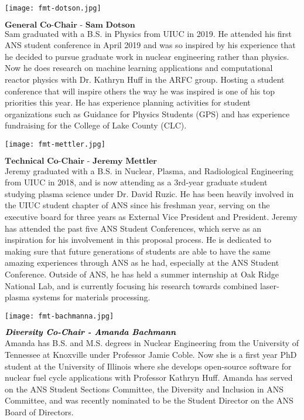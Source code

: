 \begin{minipage}{0.25\textwidth}
	\centering
	\texttt{[image: fmt-dotson.jpg]}
\end{minipage}
\begin{minipage}{0.73\textwidth}
	$\textbf{General Co-Chair - Sam Dotson}$\\
Sam graduated with a B.S. in Physics from UIUC in 2019. He attended his first ANS student conference in April 2019 and was so inspired by his experience that he decided to pursue graduate work in nuclear engineering rather than physics. Now he does research on machine learning applications and computational reactor physics with Dr. Kathryn Huff in the ARFC group. Hosting a student conference that will inspire others the way he was inspired is one of his top priorities this year. He has experience planning activities for student organizations such as Guidance for Physics Students (GPS) and has experience fundraising for the College of Lake County (CLC).
\end{minipage}

\begin{minipage}{0.25\textwidth}
	\centering
	\texttt{[image: fmt-mettler.jpg]}
\end{minipage}
\begin{minipage}{0.73\textwidth}
	$\textbf{Technical Co-Chair - Jeremy Mettler}$\\
Jeremy graduated with a B.S. in Nuclear, Plasma, and Radiological Engineering from UIUC in 2018, and is now attending as a 3rd-year graduate student studying plasma science under Dr. David Ruzic. He has been heavily involved in the UIUC student chapter of ANS since his freshman year, serving on the executive board for three years as External Vice President and President. Jeremy has attended the past five ANS Student Conferences, which serve as an inspiration for his involvement in this proposal process. He is dedicated to making sure that future generations of students are able to have the same amazing experiences through ANS as he had, especially at the ANS Student Conference. Outside of ANS, he has held a summer internship at Oak Ridge National Lab, and is currently focusing his research towards combined laser-plasma systems for materials processing.
\end{minipage}

\begin{minipage}{0.25\textwidth}
	\centering
	\texttt{[image: fmt-bachmanna.jpg]}
\end{minipage}
\begin{minipage}{0.73\textwidth}
$\textbf{\textit{Diversity Co-Chair - Amanda Bachmann}}$\\
Amanda has B.S. and M.S. degrees in Nuclear Engineering from the University of Tennessee at Knoxville under Professor Jamie Coble. Now she is a first year PhD student at the University of Illinois where she develops open-source software for nuclear fuel cycle applications with Professor Kathryn Huff. Amanda has served on the ANS Student Sections Committee, the Diversity and Inclusion in ANS Committee, and was recently nominated to be the Student Director on the ANS Board of Directors.
\end{minipage}

